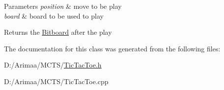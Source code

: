 \begin{DoxyParams}{Parameters}
{\em position} & move to be play \\
\hline
{\em board} & board to be used to play \\
\hline
\end{DoxyParams}
\begin{DoxyReturn}{Returns}
the \hyperlink{class_bitboard}{Bitboard} after the play 
\end{DoxyReturn}


The documentation for this class was generated from the following files\+:\begin{DoxyCompactItemize}
\item 
D\+:/\+Arimaa/\+M\+C\+T\+S/\hyperlink{_tic_tac_toe_8h}{Tic\+Tac\+Toe.\+h}\item 
D\+:/\+Arimaa/\+M\+C\+T\+S/Tic\+Tac\+Toe.\+cpp\end{DoxyCompactItemize}
